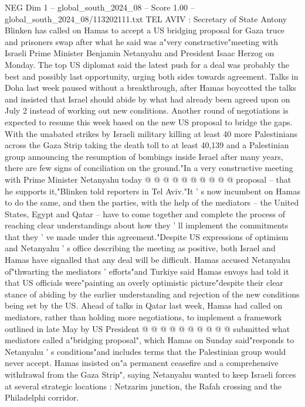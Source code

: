 \begin{textsample}{NEG Dim 1 – global\_south\_2024\_08 – Score 1.00 – global\_south\_2024\_08/113202111.txt}  \label{ex:f1_neg_444}
TEL AVIV : Secretary of State Antony Blinken has called on Hamas to accept a US bridging proposal for Gaza truce and prisoners swap after what he said was a"very constructive"meeting with Israeli Prime Minister Benjamin Netanyahu and President Isaac Herzog on Monday.
The top US diplomat said the latest push for a deal was probably the best and possibly last opportunity, urging both sides towards agreement.
Talks in Doha last week paused without a breakthrough, after Hamas boycotted the talks and insisted that Israel should abide by what had already been agreed upon on July 2 instead of working out new conditions.
Another round of negotiations is expected to resume this week based on the new US proposal to bridge the gaps.
With the unabated strikes by Israeli military killing at least 40 more Palestinians across the Gaza Strip taking the death toll to at least 40,139 and a Palestinian group announcing the resumption of bombings inside Israel after many years, there are few signs of conciliation on the ground."In a very constructive meeting with Prime Minister Netanyahu today @ @ @ @ @ @ @ @ @ @ proposal -- that he supports it,"Blinken told reporters in Tel Aviv."It ' s now incumbent on Hamas to do the same, and then the parties, with the help of the mediators -- the United States, Egypt and Qatar -- have to come together and complete the process of reaching clear understandings about how they ' ll implement the commitments that they ' ve made under this agreement."Despite US expressions of optimism and Netanyahu ' s office describing the meeting as positive, both Israel and Hamas have signalled that any deal will be difficult.
Hamas accused Netanyahu of"thwarting the mediators ' efforts"and Turkiye said Hamas envoys had told it that US officials were"painting an overly optimistic picture"despite their clear stance of abiding by the earlier understanding and rejection of the new conditions being set by the US.
Ahead of talks in Qatar last week, Hamas had called on mediators, rather than holding more negotiations, to implement a framework outlined in late May by US President @ @ @ @ @ @ @ @ @ @ submitted what mediators called a"bridging proposal", which Hamas on Sunday said"responds to Netanyahu ' s conditions"and includes terms that the Palestinian group would never accept.
Hamas insisted on"a permanent ceasefire and a comprehensive withdrawal from the Gaza Strip", saying Netanyahu wanted to keep Israeli forces at several strategic locations : Netzarim junction, the Rafah crossing and the Philadelphi corridor.

\end{textsample}
